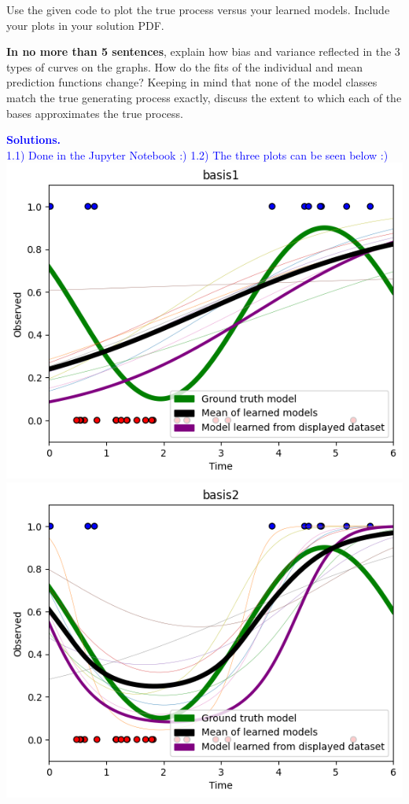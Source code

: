 \documentclass[submit]{harvardml}
\begin{document}
\begin{problem}
\begin{enumerate}
Use the given code to plot the true process versus your learned models. Include your plots in your solution PDF.

\textbf{In no more than 5 sentences}, explain how bias and variance reflected in the 3 types of curves on the graphs.  How do the fits of the individual and mean prediction functions change?  Keeping in mind that none of the model classes match the true generating process exactly, discuss the extent to which each of the bases approximates the true process.

\end{enumerate}
\end{problem}

\textcolor{blue}{\textbf{Solutions.}\\
1.1) Done in the Jupyter Notebook :)
1.2) The three plots can be seen below :) \\
\includegraphics[width=\textwidth]{images/graph1.png}
\inc\includegraphics[width=\textwidth]{images/graph2.png}
}
\end{document}
